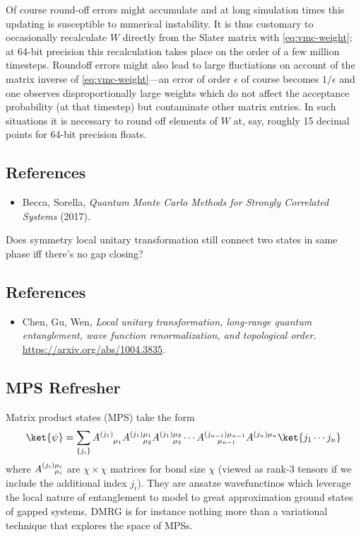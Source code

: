 \documentclass{report}
\begin{document}
Of course round-off errors might accumulate and at long simulation times this 
updating is susceptible to numerical instability. It is thus customary to 
occasionally recalculate $ W $ directly from the Slater matrix with
\cref{eq:vmc-weight}; at 64-bit precision this recalculation takes place on 
the order of a few million timesteps. Roundoff errors might also lead to large 
fluctiations on account of the matrix inverse of \cref{eq:vmc-weight}---an error 
of order $ \epsilon $ of course becomes $ 1/\epsilon $ and one observes
disproportionally large weights which do not affect the acceptance
probability (at that timestep) but contaminate other matrix entries. In such 
situations it is necessary to round off elements of $ W $ at, say, roughly 
15 decimal points for 64-bit precision floats.

\subsection*{References} 
\begin{itemize}[itemsep=0.2ex]
\item Becca, Sorella, \textit{Quantum Monte Carlo Methods for Strongly Correlated 
	Systems} (2017).
\end{itemize}

Does symmetry local unitary transformation still connect two states in same 
phase iff there's no gap closing?


\subsection*{References}
\begin{itemize}[itemsep=0.2ex]
	\item Chen, Gu, Wen, \textit{Local unitary transformation, long-range quantum
	entanglement, wave function renormalization, and topological order}.
	\url{https://arxiv.org/abs/1004.3835}.
\end{itemize}



\subsection{MPS Refresher}
Matrix product states (MPS) take the form
\begin{equation}\label{eq:mps}
	\ket{\psi} = \sum_{\left\{ j_i \right\}}
		A^{(j_1)}_{\hphantom{(j_1)}\mu_1}
		A^{(j_1)\mu_1}_{\hphantom{(j_1)}\mu_2}
		A^{(j_1)\mu_3}_{\hphantom{(j_1)}\mu_3}
		\cdots
		A^{(j_{n-1})\mu_{n-1}}_{\hphantom{(j_1)}\mu_{n-1}}
		A^{(j_n)\mu_{n}} \ket{j_1 \cdots j_n}
\end{equation}
where $ A^{(j_i)\mu_i}_{\hphantom{(j_i)} \mu_i}$ are $ \chi\times \chi $
matrices for bond size $ \chi $ (viewed as rank-3 tensors if we include the 
additional index $ j_i $). They are ansatze wavefunctinos which leverage the
local nature of entanglement to model to great approximation ground states of 
gapped systems. DMRG is for instance nothing more than a variational technique
that explores the space of MPSs.
\end{document}

